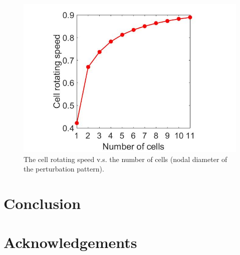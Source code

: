 \documentclass[journal,final]{new-aiaa}
\begin{document}
\begin{figure}[htb]
	\centering   
{\tiny }	\includegraphics[width=.6\textwidth]{pic/speed-vs-nd.jpg}
	\caption{The cell rotating speed v.s. the number of cells (nodal diameter of the perturbation pattern).}
	\label{fig:r67-eigenvector-18kpa}
\end{figure}


\section{Conclusion}
\label{conclusion}

\section*{Acknowledgements}


\end{document}
